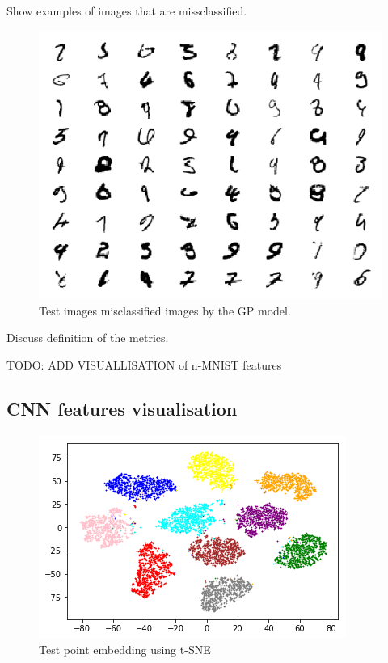 \documentclass{article}
\begin{document}
Show examples of images that are missclassified.
\begin{figure}[h]
	\centering
	\includegraphics[scale=0.6]{incorrect_mnist}
	\caption{Test images misclassified images by the GP model.}
\end{figure}


Discuss definition of the metrics.

TODO: ADD VISUALLISATION of n-MNIST features
\subsection{CNN features visualisation}
\begin{figure}[h]
	\centering
	\includegraphics[scale=0.5]{embeddings_visualisation.png}
	\caption{Test point embedding using t-SNE}
\end{figure}

\small



\end{document}
